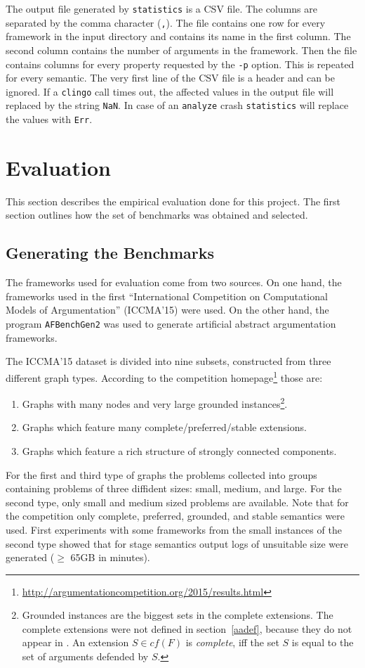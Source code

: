 \documentclass[parskip=half]{scrartcl}
\begin{document}
The output file generated by \texttt{statistics} is a CSV file. The columns are
separated by the comma character (\texttt{,}). The file contains one row for
every framework in the input directory and contains its name in the first
column. The second column contains the number of arguments in the framework.
Then the file contains columns for every property requested by the \texttt{-p}
option. This is repeated for every semantic. The very first
line of the CSV file is a header and can be ignored. If a \texttt{clingo} call
times out, the affected values in the output file will replaced by the string
\texttt{NaN}. In case of an \texttt{analyze} crash \texttt{statistics} will
replace the values with \texttt{Err}.

\section{Evaluation}
\label{evaluation}
This section describes the empirical evaluation done for this project.
The first section outlines how the set of benchmarks was obtained and selected.

\subsection{Generating the Benchmarks}
\label{gen_bench}
The frameworks used for evaluation come from two sources. On one hand,
the frameworks used in the first ``International Competition on Computational
Models of Argumentation'' (ICCMA'15) were used. On the other hand,
the program \texttt{AFBenchGen2} was used to generate artificial
abstract argumentation frameworks.

The ICCMA'15 dataset is divided into nine subsets, constructed from
three different graph types. According to the competition
homepage\footnote{\url{http://argumentationcompetition.org/2015/results.html}}
those are:
\begin{enumerate}
  \item Graphs with many nodes and very large grounded instances\footnote{
  Grounded instances are the biggest sets in the complete extensions. The complete
  extensions were not defined in section~\ref{aadef}, because they do not appear
  in \cite{baumann2016}. An extension $S\in cf(F)$ is \emph{complete}, iff
  the set $S$ is equal to the set of arguments defended by $S$.}.
  \item Graphs which feature many complete/preferred/stable extensions.
  \item Graphs which feature a rich structure of strongly connected components.
\end{enumerate}
For the first and third type of graphs the problems collected into groups
containing problems of three diffident sizes: small, medium, and large. For the
second type, only small and medium sized problems are available. Note that for
the competition only complete, preferred, grounded, and stable semantics were
used. First experiments with some frameworks from the small instances of the
second type showed that for stage semantics output logs of unsuitable size were
generated ($\geq$ 65GB in minutes).
\end{document}
